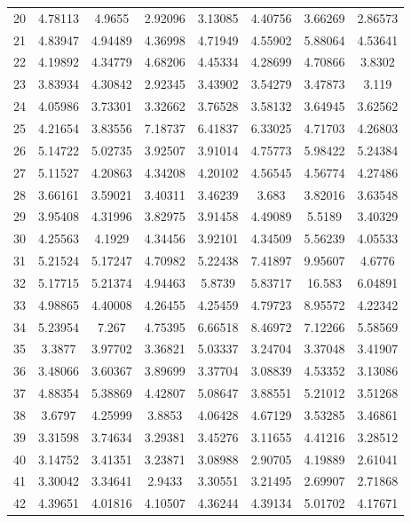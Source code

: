 \begin{center}
\begin{longtable}{cccccccc}
20 & 4.78113 & 4.9655 & 2.92096 & 3.13085 & 4.40756 & 3.66269 & 2.86573\\
21 & 4.83947 & 4.94489 & 4.36998 & 4.71949 & 4.55902 & 5.88064 & 4.53641\\
22 & 4.19892 & 4.34779 & 4.68206 & 4.45334 & 4.28699 & 4.70866 & 3.8302\\
23 & 3.83934 & 4.30842 & 2.92345 & 3.43902 & 3.54279 & 3.47873 & 3.119\\
24 & 4.05986 & 3.73301 & 3.32662 & 3.76528 & 3.58132 & 3.64945 & 3.62562\\
25 & 4.21654 & 3.83556 & 7.18737 & 6.41837 & 6.33025 & 4.71703 & 4.26803\\
26 & 5.14722 & 5.02735 & 3.92507 & 3.91014 & 4.75773 & 5.98422 & 5.24384\\
27 & 5.11527 & 4.20863 & 4.34208 & 4.20102 & 4.56545 & 4.56774 & 4.27486\\
28 & 3.66161 & 3.59021 & 3.40311 & 3.46239 & 3.683 & 3.82016 & 3.63548\\
29 & 3.95408 & 4.31996 & 3.82975 & 3.91458 & 4.49089 & 5.5189 & 3.40329\\
30 & 4.25563 & 4.1929 & 4.34456 & 3.92101 & 4.34509 & 5.56239 & 4.05533\\
31 & 5.21524 & 5.17247 & 4.70982 & 5.22438 & 7.41897 & 9.95607 & 4.6776\\
32 & 5.17715 & 5.21374 & 4.94463 & 5.8739 & 5.83717 & 16.583 & 6.04891\\
33 & 4.98865 & 4.40008 & 4.26455 & 4.25459 & 4.79723 & 8.95572 & 4.22342\\
34 & 5.23954 & 7.267 & 4.75395 & 6.66518 & 8.46972 & 7.12266 & 5.58569\\
35 & 3.3877 & 3.97702 & 3.36821 & 5.03337 & 3.24704 & 3.37048 & 3.41907\\
36 & 3.48066 & 3.60367 & 3.89699 & 3.37704 & 3.08839 & 4.53352 & 3.13086\\
37 & 4.88354 & 5.38869 & 4.42807 & 5.08647 & 3.88551 & 5.21012 & 3.51268\\
38 & 3.6797 & 4.25999 & 3.8853 & 4.06428 & 4.67129 & 3.53285 & 3.46861\\
39 & 3.31598 & 3.74634 & 3.29381 & 3.45276 & 3.11655 & 4.41216 & 3.28512\\
40 & 3.14752 & 3.41351 & 3.23871 & 3.08988 & 2.90705 & 4.19889 & 2.61041\\
41 & 3.30042 & 3.34641 & 2.9433 & 3.30551 & 3.21495 & 2.69907 & 2.71868\\
42 & 4.39651 & 4.01816 & 4.10507 & 4.36244 & 4.39134 & 5.01702 & 4.17671\\

\end{longtable}
\end{center}
